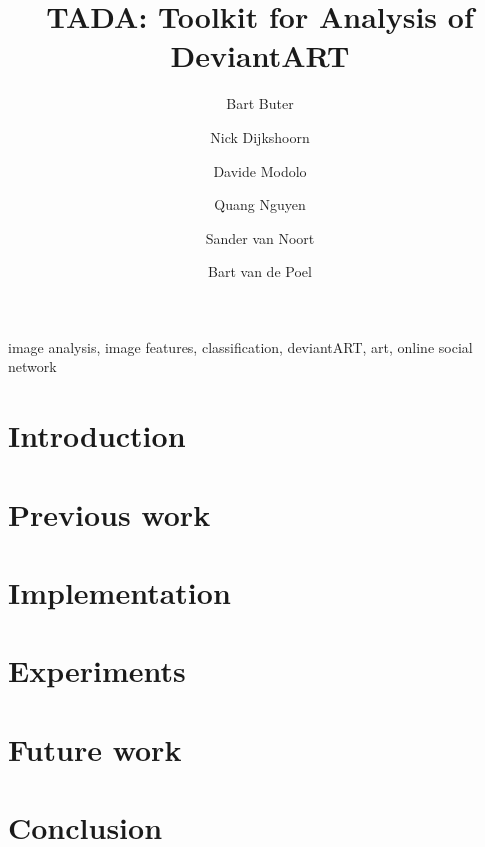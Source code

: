 \documentclass[%
        final,
        notitlepage,
        narroweqnarray,
        inline,
        ]{ieee}
\begin{document}
\title[TADA: Toolkit for Analysis of DeviantART]{TADA: Toolkit for Analysis of DeviantART}
\author{Bart Buter \and Nick Dijkshoorn \and Davide Modolo \and Quang Nguyen \and Sander van Noort \and Bart van de Poel}

\maketitle


\begin{abstract}

\end{abstract}


\begin{keywords}
image analysis, image features, classification, deviantART, art, online social network
\end{keywords}


\section{Introduction}



\section{Previous work}



\section{Implementation}



\section{Experiments}



\section{Future work}


\section{Conclusion}


\nocite{*}



\pagebreak
\tableofcontents
\end{document}
